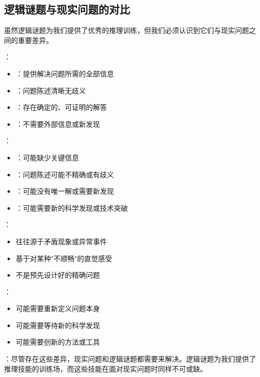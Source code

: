 \subsection{逻辑谜题与现实问题的对比}

虽然逻辑谜题为我们提供了优秀的推理训练，但我们必须认识到它们与现实问题之间的重要差异。

\begin{theorembox}[title=逻辑谜题与现实问题的对比]
：
\begin{itemize}
  \item {}：提供解决问题所需的全部信息
  \item {}：问题陈述清晰无歧义
  \item {}：存在确定的、可证明的解答
  \item {}：不需要外部信息或新发现
\end{itemize}

：
\begin{itemize}
  \item {}：可能缺少关键信息
  \item {}：问题陈述可能不精确或有歧义
  \item {}：可能没有唯一解或需要新发现
  \item {}：可能需要新的科学发现或技术突破
\end{itemize}
\end{theorembox}

\begin{theorembox}[title=现实问题的复杂性]
：
\begin{itemize}
  \item 往往源于矛盾现象或异常事件
  \item 基于对某种"不顺畅"的直觉感受
  \item 不是预先设计好的精确问题
\end{itemize}

：
\begin{itemize}
  \item 可能需要重新定义问题本身
  \item 可能需要等待新的科学发现
  \item 可能需要创新的方法或工具
\end{itemize}
\end{theorembox}

：尽管存在这些差异，现实问题和逻辑谜题都需要来解决。逻辑谜题为我们提供了推理技能的训练场，而这些技能在面对现实问题时同样不可或缺。


